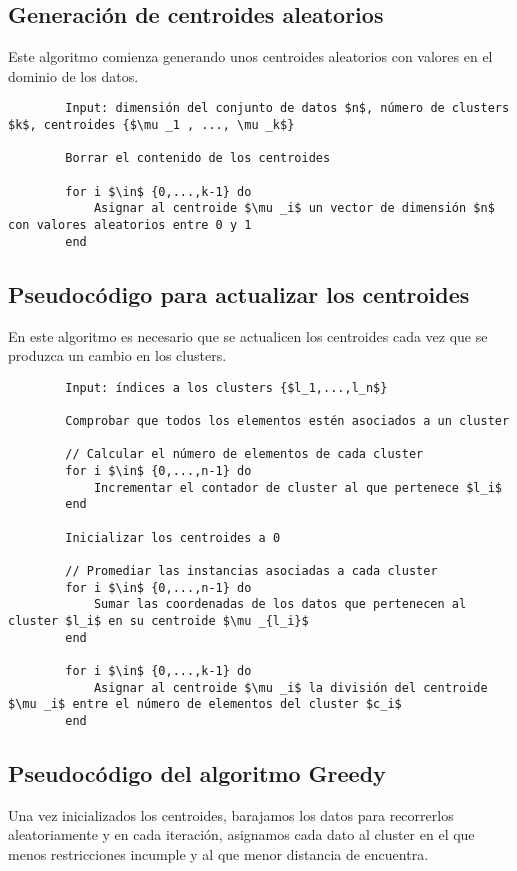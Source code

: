 		\subsection{Generación de centroides aleatorios}
		Este algoritmo comienza generando unos centroides aleatorios con valores en el dominio de los datos.

		\footnotesize
		\begin{lstlisting}
		Input: dimensión del conjunto de datos $n$, número de clusters $k$, centroides {$\mu _1 , ..., \mu _k$}
		
		Borrar el contenido de los centroides

		for i $\in$ {0,...,k-1} do 
			Asignar al centroide $\mu _i$ un vector de dimensión $n$ con valores aleatorios entre 0 y 1
		end
		\end{lstlisting}
		\normalsize

		\subsection{Pseudocódigo para actualizar los centroides}
		En este algoritmo es necesario que se actualicen los centroides cada vez que se produzca un cambio en los clusters.

		\footnotesize
		\begin{lstlisting}
		Input: índices a los clusters {$l_1,...,l_n$}

		Comprobar que todos los elementos estén asociados a un cluster

		// Calcular el número de elementos de cada cluster
		for i $\in$ {0,...,n-1} do 
			Incrementar el contador de cluster al que pertenece $l_i$
		end 

		Inicializar los centroides a 0

		// Promediar las instancias asociadas a cada cluster
		for i $\in$ {0,...,n-1} do
			Sumar las coordenadas de los datos que pertenecen al cluster $l_i$ en su centroide $\mu _{l_i}$
		end
		
		for i $\in$ {0,...,k-1} do
			Asignar al centroide $\mu _i$ la división del centroide $\mu _i$ entre el número de elementos del cluster $c_i$
		end
		\end{lstlisting}
		\normalsize

		\subsection{Pseudocódigo del algoritmo Greedy}
		Una vez inicializados los centroides, barajamos los datos para recorrerlos aleatoriamente y en cada iteración, asignamos 
		cada dato al cluster en el que menos restricciones incumple y al que menor distancia de encuentra.

